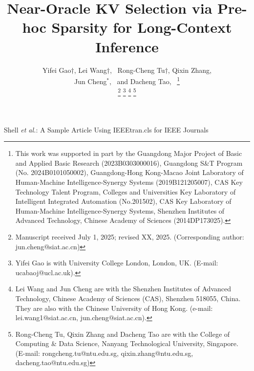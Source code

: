 \documentclass[lettersize,journal]{IEEEtran}
\begin{document}
\title{Near-Oracle KV Selection via Pre-hoc Sparsity for Long-Context Inference} %

\author{Yifei Gao$\dagger$, Lei Wang$\dagger$,~ Rong-Cheng Tu$\dagger$, Qixin Zhang, \\ Jun Cheng$^*$,~ and Dacheng Tao,~
\thanks{This work was supported in part by the Guangdong Major Project of Basic and Applied Basic Research (2023B0303000016), Guangdong S\&T Program (No. 2024B0101050002), Guangdong-Hong Kong-Macao Joint Laboratory of Human-Machine Intelligence-Synergy Systems (2019B121205007), CAS Key Technology Talent Program, Colleges and Universities Key Laboratory of Intelligent Integrated Automation (No.201502), CAS Key Laboratory of Human-Machine Intelligence-Synergy Systems, Shenzhen Institutes of Advanced Technology, Chinese Academy of Sciences (2014DP173025). }

\thanks{Manuscript received July 1, 2025; revised XX, 2025. (Corresponding author: jun.cheng@siat.ac.cn)}
\thanks{Yifei Gao is with University College London, London, UK. (E-mail: ucabaoj@ucl.ac.uk).}
\thanks{Lei Wang and Jun Cheng are with the Shenzhen Institutes of Advanced Technology, Chinese Academy of Sciences (CAS), Shenzhen 518055, China. They are also with the Chinese University of Hong Kong.  (e-mail: lei.wang1@siat.ac.cn, jun.cheng@siat.ac.cn).}
\thanks{Rong-Cheng Tu, Qixin Zhang and Dacheng Tao are with the College of Computing \& Data Science, Nanyang Technological University, Singapore. (E-mail: rongcheng.tu@ntu.edu.sg, qixin.zhang@ntu.edu.sg, dacheng.tao@ntu.edu.sg)}
}

%
{Shell \MakeLowercase{\textit{et al.}}: A Sample Article Using IEEEtran.cls for IEEE Journals}


\maketitle
\end{document}
